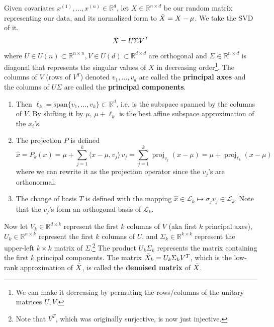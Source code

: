 \documentclass{article}
\DeclareMathOperator{\proj}{proj}
\begin{document}
  \begin{theorem} 
    Given covariates $x^{(1)}, \ldots, x^{(n)} \in \mathbb{R}^{d}$, let $X \in \mathbb{R}^{n \times d}$ be our random matrix representing our data, and its normalized form to $\Tilde{X} = X - \mu$. We take the SVD of it. 
    \begin{equation}
      \Tilde{X} = U \Sigma V^T
    \end{equation}
    where $U \in U(n) \subset \mathbb{R}^{n \times n}, V \in U(d) \subset \mathbb{R}^{d \times d}$ are orthogonal and $\Sigma \in \mathbb{R}^{n \times d}$ is diagonal that represents the singular values of $X$ in decreasing order\footnote{We can make it decreasing by permuting the rows/columns of the unitary matrices $U, V$.}. The columns of $V$ (rows of $V^T$) denoted $v_1, \ldots, v_d$ are called the \textbf{principal axes} and the columns of $U\Sigma$ are called the \textbf{principal components}. 
    \begin{enumerate}
      \item Then $\ell_k = \mathrm{span}\{v_1, \ldots, v_k\} \subset \mathbb{R}^d$, i.e. is the subspace spanned by the columns of $V$. By shifting it by $\mu$, $\mu + \ell_k$ is the best affine subspace approximation of the $x_i$'s. 

      \item The projection $P$ is defined 
      \begin{equation}
        \hat{x} = P_k (x) = \mu + \sum_{j=1}^k \langle x - \mu, v_j \rangle \, v_j = \sum_{j=1}^k \proj_{v_j} (x - \mu) = \mu + \proj_{\ell_k} (x - \mu)
      \end{equation}
      where we can rewrite it as the projection operator since the $v_j$'s are orthonormal. 

    \item The change of basis $T$ is defined with the mapping $\hat{x} \in \mathcal{L}_k \mapsto \sigma_j v_j \in \mathcal{L}_k$. Note that the $v_j$'s form an orthogonal basis of $\mathcal{L}_k$. 
    \end{enumerate} 
    Now let $V_k \in \mathbb{R}^{d \times k}$ represent the first $k$ columns of $V$ (aka first $k$ principal axes), $U_k \in \mathbb{R}^{n \times k}$ represent the first $k$ columns of $U$, and $\Sigma_k \in \mathbb{R}^{k \times k}$ represent the upper-left $k \times k$ matrix of $\Sigma$.\footnote{Note that $V^T$, which was originally surjective, is now just injective.} The product $U_k \Sigma_k$ represents the matrix containing the first $k$ principal components. The matrix $\Tilde{X}_k = U_k \Sigma_k V^T$, which is the low-rank approximation of $\Tilde{X}$, is called the \textbf{denoised matrix} of $\Tilde{X}$. 
  \end{theorem}
\end{document}
